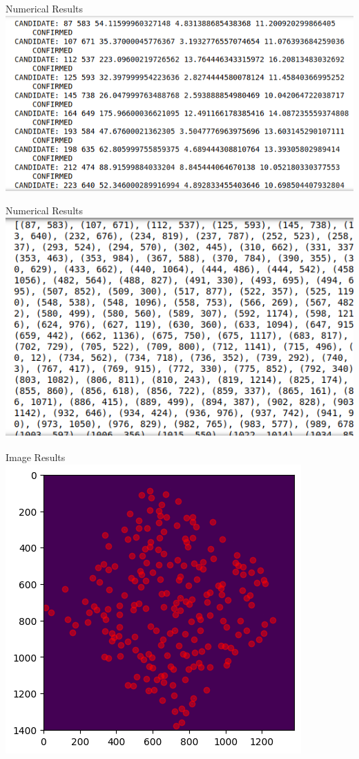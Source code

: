 \documentclass[10pt,aspectratio=169]{beamer}
\begin{document}
\begin{frame}{Numerical Results}
  \centering
  \includegraphics[scale = .5]{starnum1.png}
\end{frame}

\begin{frame}{Numerical Results}
  \centering
  \includegraphics[scale = .5]{starcoords.png}
\end{frame}
\begin{frame}{Image Results}
  \centering
  \includegraphics[scale = .75]{finalresults.png}
\end{frame}
\end{document}
